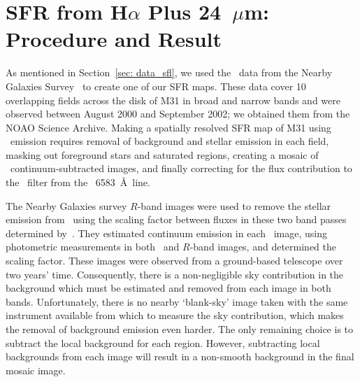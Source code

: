 \chapter{SFR from H$\alpha$ Plus 24~$\mu$m: Procedure and Result}
\pagestyle{plain}
\label{app:halpha}
\myappendices

As mentioned in Section~\ref{sec: data_sfl}, we used the \halpha\ data from the Nearby Galaxies Survey~\citep{Massey07} to create one of our SFR maps. These data cover 10 overlapping fields across the disk of M31 in broad and narrow bands and were observed between August 2000 and September 2002; we obtained them  from the NOAO Science Archive. Making a spatially resolved SFR map of M31 using \halpha\ emission requires removal of background and stellar emission in each field, masking out foreground stars and saturated regions, creating a mosaic of \halpha\ continuum-subtracted images, and finally correcting for the flux contribution to the \halpha\ filter from the \nii\ 6583~\AA\ line.

The Nearby Galaxies survey $R$-band images were used to remove the stellar emission from \halpha\ using the scaling factor between fluxes in these two band passes determined by~\citet{Azimlu11}. They estimated continuum emission in each \halpha\ image, using photometric measurements in both \halpha\ and $R$-band images, and determined the scaling factor. These images were observed from a ground-based telescope over two years' time. Consequently, there is a non-negligible sky contribution in the background which must be estimated and removed from each image in both bands. Unfortunately, there is no nearby `blank-sky' image taken with the same instrument available from which to measure the sky contribution, which makes the removal of background emission even harder. The only remaining choice is to subtract the local background for each region. However, subtracting local backgrounds from each image will result in a non-smooth background in the final mosaic image. 


